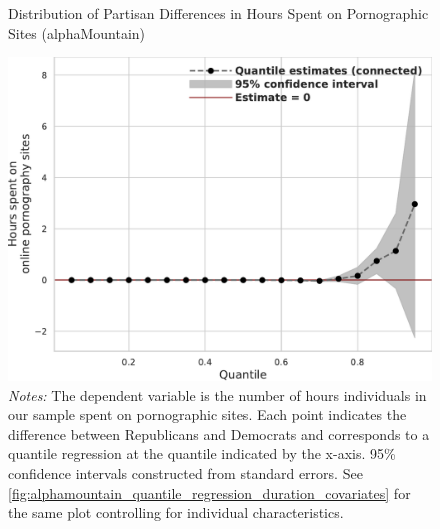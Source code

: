 \documentclass[12pt,twoside]{article}
\begin{document}
\begin{figure}[t]
	\centering
	\caption{Distribution of Partisan Differences in Hours Spent on Pornographic Sites (alphaMountain)}
	\includegraphics[width=.7\linewidth]{figs/alphamountain_quantile_reg_duration_adult.pdf}
	\caption*{\footnotesize \emph{Notes:} 
		The dependent variable is the number of hours individuals in our sample spent on pornographic sites.
		Each point indicates the difference between Republicans and Democrats and corresponds to a quantile regression at the quantile indicated by the x-axis.
		95\% confidence intervals constructed from standard errors.
		See \cref{fig:alphamountain_quantile_regression_duration_covariates} for the same plot controlling for individual characteristics.
	}
	\label{fig:alphamountain_quantile_regression_duration}
\end{figure}
\end{document}
